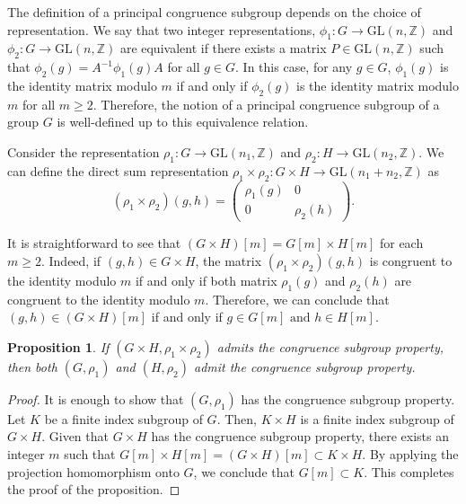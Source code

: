 \documentclass[12pt]{amsart}
\newtheorem{proposition}[equation]{Proposition}
\theoremstyle{definition}
\numberwithin{equation}{section}
\newcommand{\GL}{\mathrm{GL}}
\begin{document}
The definition of a principal congruence subgroup depends on the choice of representation. We say that two integer representations, $\phi_1: G \to \GL(n, \mathbb{Z})$ and $\phi_2:G \to \GL(n, \mathbb{Z})$ are equivalent if there exists a matrix $P\in \mathrm{GL}(n, \mathbb{Z})$ such that $\phi_2(g)=A^{-1}\phi_1(g)A$ for all $g \in G$. In this case, for any $g\in G$, $\phi_1(g)$ is the identity matrix modulo $m$ if and only if $\phi_2(g)$ is the identity matrix modulo $m$ for all $m\geq 2$. Therefore, the notion of a principal congruence subgroup of a group $G$ is well-defined up to this equivalence relation.


Consider the representation $\rho_1:G\to \GL(n_1, \mathbb Z)$ and $\rho_2: H \to \GL(n_2, \mathbb Z)$. We can define the direct sum representation $\rho_1\times \rho_2: G \times H \to \GL(n_1+n_2, \mathbb Z)$ as 
$$
(\rho_1 \times \rho_2)(g, h) = \left(\begin{matrix}
\rho_1(g) & 0 \\
0 & \rho_2(h)
\end{matrix}\right).
$$

It is straightforward to see that $(G\times H) [m] = G[m]\times H[m]$ for each $m\geq 2$.  Indeed,  if $(g, h) \in G \times H$, the matrix
$(\rho_1 \times \rho_2)(g, h) $ is congruent to the identity modulo  $m$ if and only if both matrix $\rho_1(g)$ and $\rho_2(h)$ are congruent to the identity modulo  $m$. Therefore, we can conclude that $(g,h) \in (G \times H)[m]$ if and only if $g \in G[m] \text{ and } h \in H[m]$.

\begin{proposition}\label{prop:cspdirect}
If $(G\times H, \rho_1\times \rho_2)$ admits the congruence subgroup property, then both $(G,\rho_1)$ and $(H,\rho_2)$ admit the  congruence subgroup property.
\end{proposition}
\begin{proof}
It is enough to show that $(G,\rho_1)$ has the congruence subgroup property. Let $K$ be a finite index subgroup of $G$. Then, $K\times H$ is a finite index subgroup of $G\times H$. Given that $G\times H$ has the congruence subgroup property, there exists an integer $m$ such that $G[m]\times H[m]=(G\times H)[m]\subset K\times H$. By applying the projection homomorphism onto $G$, we conclude that $G[m]\subset K$. This completes the proof of the proposition. 
\end{proof}
\end{document}
